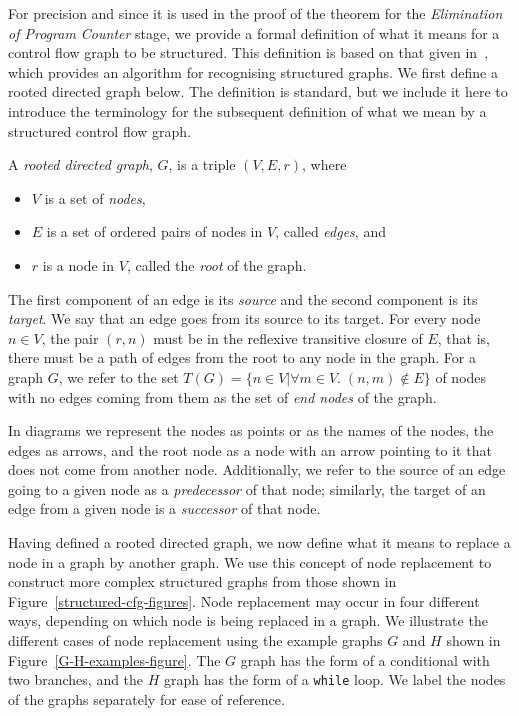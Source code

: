 For precision and since it is used in the proof of the theorem for the
\emph{Elimination of Program Counter} stage, we provide a formal
definition of what it means for a control flow graph to be structured. 
This definition is based on that given in~\cite{bento2017}, which
provides an algorithm for recognising structured graphs.
We first define a rooted directed graph below. 
The definition is standard, but we include it here to introduce the
terminology for the subsequent definition of what we mean by a
structured control flow graph.
\begin{defn} A \emph{rooted directed graph},
$G$, is a triple $(V,E,r)$, where
  \begin{itemize}
  \item $V$ is a set of \emph{nodes},
  \item $E$ is a set of ordered pairs of nodes in $V$, called
\emph{edges}, and
  \item $r$ is a node in $V$, called the \emph{root} of the graph.
  \end{itemize}
  The first component of an edge is its \emph{source}
  and the second component is its \emph{target}. 
  We say that an edge goes from its source to its target. 
  For every node $n \in V$, the pair $(r,n)$ must be in the reflexive
  transitive closure of $E$, that is, there must be a path of edges
  from the root to any node in the graph.
  For a graph $G$, we refer to the set
  $T(G) = \{ n \in V | \forall m \in V.\; (n,m) \notin E\}$ of nodes
  with no edges coming from them as the set of \emph{end nodes} of the
  graph.
\end{defn}
In diagrams we represent the nodes as points or as the names of the
nodes, the edges as arrows, and the root node as a node with an arrow
pointing to it that does not come from another node.
Additionally, we refer to the source of an edge going to a given node
as a \emph{predecessor} of that node; similarly, the target of an edge
from a given node is a \emph{successor} of that node.

Having defined a rooted directed graph, we now define what it means to
replace a node in a graph by another graph.
We use this concept of node replacement to construct more complex
structured graphs from those shown in
Figure~\ref{structured-cfg-figures}.
Node replacement may occur in four different ways, depending on which
node is being replaced in a graph.
We illustrate the different cases of node replacement using the
example graphs $G$ and $H$ shown in Figure~\ref{G-H-examples-figure}.
The $G$ graph has the form of a conditional with two branches, and the
$H$ graph has the form of a \texttt{while} loop.
We label the nodes of the graphs separately for ease of reference.


